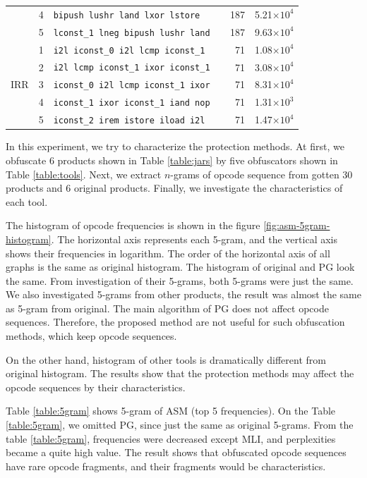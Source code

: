 \documentclass[conference]{IEEEtran}
\begin{document}
\begin{table}[t]
{\begin{tabular}{lc|l|r|r}
& 4 & \verb!bipush lushr land lxor lstore    ! & 187 & 5.21$\times10^4$ \\
& 5 & \verb!lconst_1 lneg bipush lushr land  ! & 187 & 9.63$\times10^4$ \\ \hline
\multirow{5}{*}{{IRR}}
& 1 & \verb!i2l iconst_0 i2l lcmp iconst_1  ! & 71 & 1.08$\times10^4$ \\
& 2 & \verb!i2l lcmp iconst_1 ixor iconst_1 ! & 71 & 3.08$\times10^4$ \\
& 3 & \verb!iconst_0 i2l lcmp iconst_1 ixor ! & 71 & 8.31$\times10^4$ \\
& 4 & \verb!iconst_1 ixor iconst_1 iand nop ! & 71 & 1.31$\times10^3$ \\
& 5 & \verb!iconst_2 irem istore iload i2l  ! & 71 & 1.47$\times10^4$ \\
  \end{tabular}}
\end{table}

In this experiment, we try to characterize the protection methods.  At
first, we obfuscate 6 products shown in Table \ref{table:jars} by five
obfuscators shown in Table \ref{table:tools}.  Next, we extract
$n$-grams of opcode sequence from gotten 30 products and 6 original
products.  Finally, we investigate the characteristics of each tool.

The histogram of opcode frequencies is shown in the figure
\ref{fig:asm-5gram-histogram}.  The horizontal axis represents each
5-gram, and the vertical axis shows their frequencies in logarithm.
The order of the horizontal axis of all graphs is the same as original
histogram.
%
The histogram of original and PG look the same.  From investigation
of their 5-grams, both 5-grams were just the same.  We also
investigated 5-grams from other products, the result was almost the
same as 5-gram from original.  The main algorithm of PG does not
affect opcode sequences.  Therefore, the proposed method are not
useful for such obfuscation methods, which keep opcode sequences.

On the other hand, histogram of other tools is dramatically different
from original histogram.  The results show that the protection methods
may affect the opcode sequences by their characteristics.

Table \ref{table:5gram} shows 5-gram of ASM (top 5 frequencies).  On
the Table \ref{table:5gram}, we omitted PG, since just the same as
original 5-grams.  From the table \ref{table:5gram}, frequencies were
decreased except MLI, and perplexities became a quite high value.  The
result shows that obfuscated opcode sequences have rare opcode
fragments, and their fragments would be characteristics.
\end{document}
